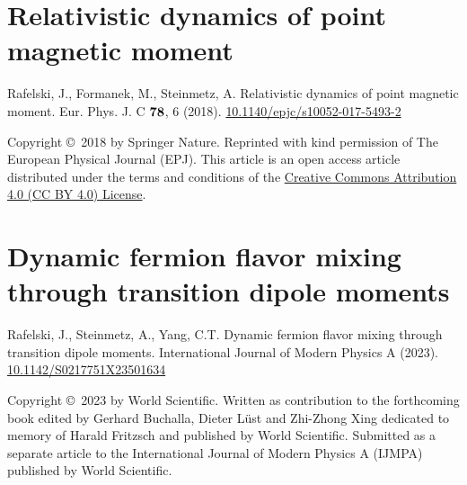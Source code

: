 %

\chapter{Relativistic dynamics of point magnetic moment}
\label{appendixC}
\begin{center}
Rafelski, J., Formanek, M., Steinmetz, A. Relativistic dynamics of point magnetic moment. Eur. Phys. J. C $\boldsymbol{78}$, 6 (2018). \href{https://doi.org/10.1140/epjc/s10052-017-5493-2}{10.1140/epjc/s10052-017-5493-2}
\end{center}

\noindent Copyright \copyright\ 2018 by Springer Nature. Reprinted with kind permission of The European Physical Journal (EPJ). This article is an open access article distributed under the terms and conditions of the \href{https://creativecommons.org/licenses/by/4.0/}{Creative Commons Attribution 4.0 (CC BY 4.0) License}.

%

\chapter{Dynamic fermion flavor mixing through transition dipole moments}
\label{appendixD}
\begin{center}
Rafelski, J., Steinmetz, A., Yang, C.T. Dynamic fermion flavor mixing through transition dipole moments. International Journal of Modern Physics A (2023). \href{https://doi.org/10.1142/S0217751X23501634}{10.1142/S0217751X23501634}
\end{center}

\noindent Copyright \copyright\ 2023 by World Scientific. Written as contribution to the forthcoming book edited by Gerhard Buchalla, Dieter L\"ust
and Zhi-Zhong Xing dedicated to memory of Harald Fritzsch and published by World Scientific. Submitted as a separate article to the International Journal of Modern Physics A (IJMPA) published by World Scientific.

%

